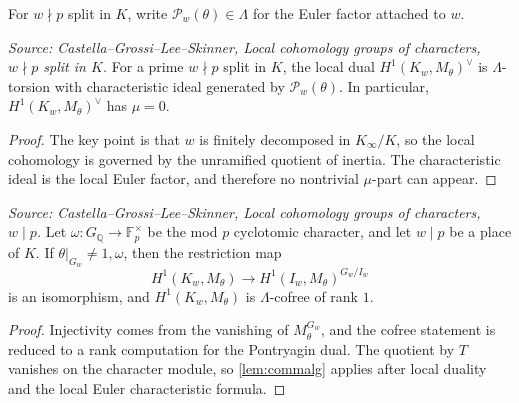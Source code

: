 For \(w\nmid p\) split in \(K\), write \(\mathcal{P}_w(\theta)\in\Lambda\) for the Euler factor attached to \(w\).

\begin{lemma}
  \label{lem:local-char-wneqp}
  \textit{Source: Castella--Grossi--Lee--Skinner, Local cohomology groups of characters, \(w\nmid p\) split in \(K\).}
  For a prime \(w\nmid p\) split in \(K\), the local dual \(H^1(K_w,M_\theta)^\vee\) is \(\Lambda\)-torsion with characteristic ideal generated by \(\mathcal{P}_w(\theta)\). In particular, \(H^1(K_w,M_\theta)^\vee\) has \(\mu=0\).
\end{lemma}

\begin{proof}
The key point is that \(w\) is finitely decomposed in \(K_\infty/K\), so the local cohomology is governed by the unramified quotient of inertia. The characteristic ideal is the local Euler factor, and therefore no nontrivial \(\mu\)-part can appear.
\end{proof}

\begin{proposition}
  \label{lem:local-char-wp}
  \textit{Source: Castella--Grossi--Lee--Skinner, Local cohomology groups of characters, \(w\mid p\).}
  Let \(\omega : G_{\mathbb{Q}}\to \mathbb{F}_p^\times\) be the mod \(p\) cyclotomic character, and let \(w\mid p\) be a place of \(K\). If \(\theta|_{G_w}\neq 1,\omega\), then the restriction map
  \[
    H^1(K_w,M_\theta)\to H^1(I_w,M_\theta)^{G_w/I_w}
  \]
  is an isomorphism, and \(H^1(K_w,M_\theta)\) is \(\Lambda\)-cofree of rank \(1\).
\end{proposition}

\begin{proof}
Injectivity comes from the vanishing of \(M_\theta^{G_w}\), and the cofree statement is reduced to a rank computation for the Pontryagin dual. The quotient by \(T\) vanishes on the character module, so \cref{lem:commalg} applies after local duality and the local Euler characteristic formula.
\end{proof}

